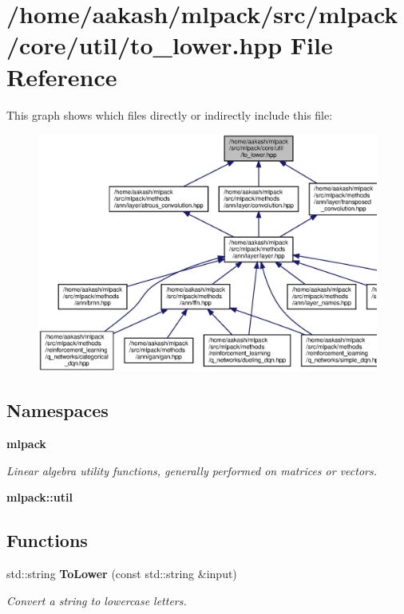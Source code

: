 \section{/home/aakash/mlpack/src/mlpack/core/util/to\+\_\+lower.hpp File Reference}
\label{to__lower_8hpp}
This graph shows which files directly or indirectly include this file\+:
\nopagebreak
\begin{figure}[H]
\begin{center}
\leavevmode
\includegraphics[width=350pt]{to__lower_8hpp__dep__incl}
\end{center}
\end{figure}
\subsection*{Namespaces}
\begin{DoxyCompactItemize}
\item 
 \textbf{ mlpack}
\begin{DoxyCompactList}\small\item\em Linear algebra utility functions, generally performed on matrices or vectors. \end{DoxyCompactList}\item 
 \textbf{ mlpack\+::util}
\end{DoxyCompactItemize}
\subsection*{Functions}
\begin{DoxyCompactItemize}
\item 
std\+::string \textbf{ To\+Lower} (const std\+::string \&input)
\begin{DoxyCompactList}\small\item\em Convert a string to lowercase letters. \end{DoxyCompactList}\end{DoxyCompactItemize}



